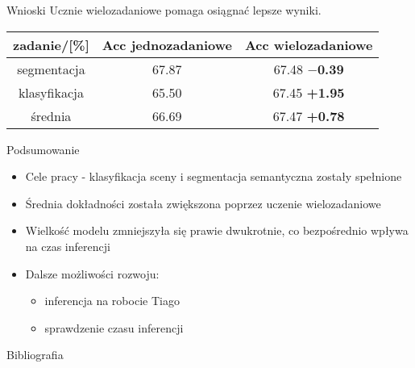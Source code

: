 \documentclass[10pt]{beamer}
\begin{document}
\begin{frame}{Wnioski}
    Ucznie wielozadaniowe pomaga osiągnać lepsze wyniki.
    \begin{table}[]
        \begin{tabular}{c|cc}
        zadanie/{[}\%{]} & Acc jednozadaniowe & Acc wielozadaniowe \\ \hline
        segmentacja      & 67.87               & 67.48  \footnotesize{\textbf{$-$0.39}}        \\
        klasyfikacja     & 65.50               & 67.45  \footnotesize{\textbf{+1.95}}        \\ \hline
        średnia          & 66.69               & 67.47  \footnotesize{\textbf{+0.78}}       
        \end{tabular}
        \end{table}
    
\end{frame}
\begin{frame}{Podsumowanie}
    \begin{itemize}
        \item Cele pracy - klasyfikacja sceny i segmentacja semantyczna zostały spełnione
        \item Średnia dokładności została zwiększona poprzez uczenie wielozadaniowe
        \item Wielkość modelu zmniejszyła się prawie dwukrotnie, co bezpośrednio wpływa na czas inferencji
        \item Dalsze możliwości rozwoju:
        \begin{itemize}
            \item inferencja na robocie Tiago
            \item sprawdzenie czasu inferencji
        \end{itemize}
    \end{itemize}

    

\end{frame}
\begin{frame}{Bibliografia}
    
    
    
    
\end{frame}
\end{document}
